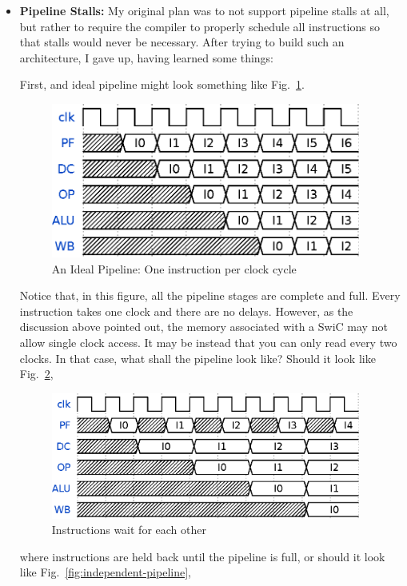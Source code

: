 \documentclass{gqtekspec}
\begin{document}
\begin{itemize}
\item {\bf Pipeline Stalls:} My original plan was to not support pipeline
	stalls at all, but rather to require the compiler to properly schedule
	all instructions so that stalls would never be necessary.  After trying
	to build such an architecture, I gave up, having learned some things:

	First, and ideal pipeline might look something like
	Fig.~\ref{fig:ideal-pipeline}.
\begin{figure}
\begin{center}
\includegraphics[width=4in]{../gfx/fullpline.eps}
\caption{An Ideal Pipeline: One instruction per clock cycle}\label{fig:ideal-pipeline}
\end{center}\end{figure}
	Notice that, in this figure, all the pipeline stages are complete and
	full.  Every instruction takes one clock and there are no delays.
	However, as the discussion above pointed out, the memory associated
	with a SwiC may not allow single clock access.  It may be instead
	that you can only read every two clocks.  In that case, what shall
	the pipeline look like?  Should it look like
	Fig.~\ref{fig:waiting-pipeline},
\begin{figure}\begin{center}
\includegraphics[width=4in]{../gfx/stuttra.eps}
\caption{Instructions wait for each other}\label{fig:waiting-pipeline}
\end{center}\end{figure}
	where instructions are held back until the pipeline is full, or should
	it look like Fig.~\ref{fig:independent-pipeline},

\end{itemize}
\end{document}
